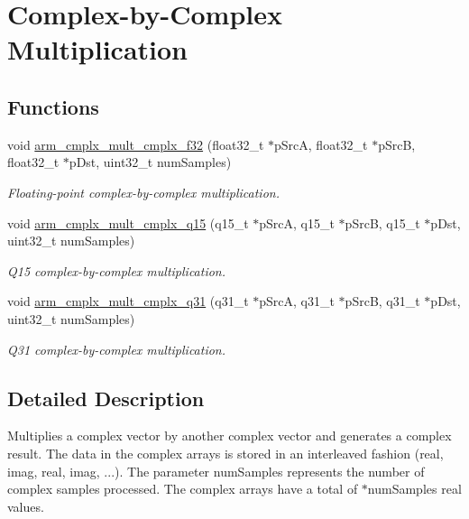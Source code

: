 \hypertarget{group___cmplx_by_cmplx_mult}{\section{Complex-\/by-\/\-Complex Multiplication}
\label{group___cmplx_by_cmplx_mult}
}
\subsection*{Functions}
\begin{DoxyCompactItemize}
\item 
void \hyperlink{group___cmplx_by_cmplx_mult_ga14b47080054a1ba1250a86805be1ff6b}{arm\-\_\-cmplx\-\_\-mult\-\_\-cmplx\-\_\-f32} (float32\-\_\-t $\ast$p\-Src\-A, float32\-\_\-t $\ast$p\-Src\-B, float32\-\_\-t $\ast$p\-Dst, uint32\-\_\-t num\-Samples)
\begin{DoxyCompactList}\small\item\em Floating-\/point complex-\/by-\/complex multiplication. \end{DoxyCompactList}\item 
void \hyperlink{group___cmplx_by_cmplx_mult_ga67e96abfc9c3e30efb70a2ec9d0fe7e8}{arm\-\_\-cmplx\-\_\-mult\-\_\-cmplx\-\_\-q15} (q15\-\_\-t $\ast$p\-Src\-A, q15\-\_\-t $\ast$p\-Src\-B, q15\-\_\-t $\ast$p\-Dst, uint32\-\_\-t num\-Samples)
\begin{DoxyCompactList}\small\item\em Q15 complex-\/by-\/complex multiplication. \end{DoxyCompactList}\item 
void \hyperlink{group___cmplx_by_cmplx_mult_ga1829e50993a90742de225a0ce4213838}{arm\-\_\-cmplx\-\_\-mult\-\_\-cmplx\-\_\-q31} (q31\-\_\-t $\ast$p\-Src\-A, q31\-\_\-t $\ast$p\-Src\-B, q31\-\_\-t $\ast$p\-Dst, uint32\-\_\-t num\-Samples)
\begin{DoxyCompactList}\small\item\em Q31 complex-\/by-\/complex multiplication. \end{DoxyCompactList}\end{DoxyCompactItemize}


\subsection{Detailed Description}
Multiplies a complex vector by another complex vector and generates a complex result. The data in the complex arrays is stored in an interleaved fashion (real, imag, real, imag, ...). The parameter {\ttfamily num\-Samples} represents the number of complex samples processed. The complex arrays have a total of {$\ast$num\-Samples} real values.

